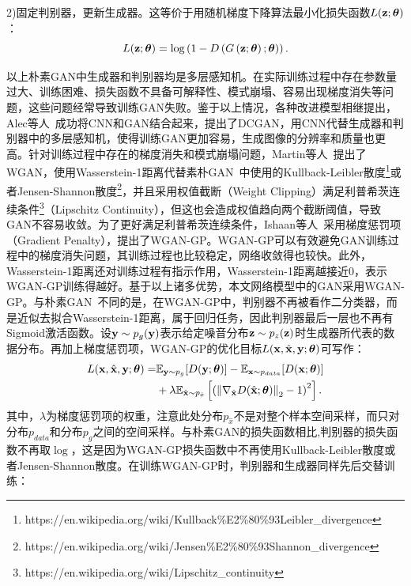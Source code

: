 2)固定判别器，更新生成器。这等价于用随机梯度下降算法最小化损失函数$L(\mathbf{z};\mbox{\boldmath $\theta$})$：
	\begin{equation}
	L(\mathbf{z};\mbox{\boldmath $\theta$})=\log \left(1-D\left(G\left(\mathbf{z};\mbox{\boldmath $\theta$}\right);\mbox{\boldmath $\theta$}\right)\right).
	\end{equation}

\noindent 以上朴素GAN中生成器和判别器均是多层感知机。在实际训练过程中存在参数量过大、训练困难、损失函数不具备可解释性、模式崩塌、容易出现梯度消失等问题，这些问题经常导致训练GAN失败。鉴于以上情况，各种改进模型相继提出，Alec等人~\cite{radford2015unsupervised}成功将CNN和GAN结合起来，提出了DCGAN，用CNN代替生成器和判别器中的多层感知机，使得训练GAN更加容易，生成图像的分辨率和质量也更高。针对训练过程中存在的梯度消失和模式崩塌问题，Martin等人~\cite{arjovsky2017wasserstein}提出了WGAN，使用Wasserstein-1距离代替素朴GAN~\cite{goodfellow2014generative}中使用的Kullback-Leibler散度\footnote{https://en.wikipedia.org/wiki/Kullback\%E2\%80\%93Leibler\_divergence}或者Jensen-Shannon散度\footnote{https://en.wikipedia.org/wiki/Jensen\%E2\%80\%93Shannon\_divergence}，并且采用权值截断（Weight Clipping）满足利普希茨连续条件\footnote{https://en.wikipedia.org/wiki/Lipschitz\_continuity}（Lipschitz Continuity），但这也会造成权值趋向两个截断阈值，导致GAN不容易收敛。为了更好满足利普希茨连续条件，Ishaan等人~\cite{gulrajani2017improved}采用梯度惩罚项（Gradient Penalty），提出了WGAN-GP。WGAN-GP可以有效避免GAN训练过程中的梯度消失问题，其训练过程也比较稳定，网络收敛得也较快。此外，Wasserstein-1距离还对训练过程有指示作用，Wasserstein-1距离越接近0，表示WGAN-GP训练得越好。基于以上诸多优势，本文网络模型中的GAN采用WGAN-GP。与朴素GAN~\cite{goodfellow2014generative}不同的是，在WGAN-GP中，判别器不再被看作二分类器，而是近似去拟合Wasserstein-1距离，属于回归任务，因此判别器最后一层也不再有Sigmoid激活函数。设$\mathbf{y}\sim {p}_{g}(\mathbf{y})$表示给定噪音分布$\mathbf{z}\sim {p}_{{z}}(\mathbf{z})$时生成器所代表的数据分布。再加上梯度惩罚项，WGAN-GP的优化目标$L(\mathbf{x},\hat{\mathbf{x}},\mathbf{y};\mbox{\boldmath $\theta$})$可写作：
\begin{equation}\label{wgan_gp_loss_func}
  \begin{aligned}
	L(\mathbf{x},\hat{\mathbf{x}},\mathbf{y};\mbox{\boldmath $\theta$})=&\mathbb{E}_{\mathbf{y} \sim {p}_{{g}}}[D(\mathbf{y};\mbox{\boldmath $\theta$})]-\mathbb{E}_{\mathbf{x} \sim {p}_{{data}}}[D(\mathbf{x};\mbox{\boldmath $\theta$})] \\ &+\lambda \mathbb{E}_{\hat{\mathbf{x}} \sim {p}_{\hat{{x}}}}\left[\left(\left\|\nabla_{\hat{\mathbf{x}}}D(\hat{\mathbf{x}};\mbox{\boldmath $\theta$})\right\|_{2}-1\right)^{2}\right].
  \end{aligned}
\end{equation}
其中，$\lambda$为梯度惩罚项的权重，注意此处分布${p}_{\hat{{x}}}$不是对整个样本空间采样，而只对分布${p}_{{data}}$和分布${p}_{{g}}$之间的空间采样。与朴素GAN的损失函数相比,判别器的损失函数不再取$\log$，这是因为WGAN-GP损失函数中不再使用Kullback-Leibler散度或者Jensen-Shannon散度。在训练WGAN-GP时，判别器和生成器同样先后交替训练：

